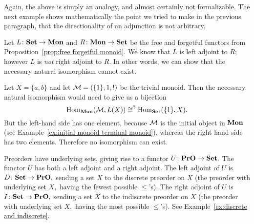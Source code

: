 \documentclass[../main/CT4S-EN-RU]{subfiles}
\begin{document}
\begin{blockRUS}
\end{blockRUS}

\begin{blockENG}
Again, the above is simply an analogy, and almost certainly not formalizable. The next example shows mathematically the point we tried to make in the previous paragraph, that the directionality of an adjunction is not arbitrary.
\end{blockENG}

\begin{blockRUS}
\end{blockRUS}

\begin{exampleENG}\label{ex:adjunction monoids and sets}
Let $L\colon{\mathbf{Set}}\rightarrow{\mathbf{Mon}}$ and $R\colon{\mathbf{Mon}}\rightarrow{\mathbf{Set}}$ be the free and forgetful functors from Proposition~\ref{prop:free forgetful monoid}. We know that $L$ is left adjoint to $R$; however $L$ is {\em not} right adjoint to $R.$ In other words, we can show that the necessary natural isomorphism cannot exist.

Let $X=\{a,b\}$ and let $\mathcal{M}=(\{1\},1,!)$ be the trivial monoid. Then the necessary natural isomorphism would need to give us a bijection 
$$\operatorname{Hom}_{\mathbf{Mon}}(\mathcal{M},L(X))\cong^?\operatorname{Hom}_{\mathbf{Set}}(\{1\},X).$$ 
But the left-hand side has one element, because $\mathcal{M}$ is the initial object in ${\mathbf{Mon}}$ (see Example~\ref{ex:initial monoid terminal monoid}), whereas the right-hand side has two elements. Therefore no isomorphism can exist.
\end{exampleENG}

\begin{exampleRUS}\label{ex:adjunction monoids and sets}
\end{exampleRUS}

\begin{exampleENG}
Preorders have underlying sets, giving rise to a functor $U\colon{\mathbf{PrO}}\rightarrow{\mathbf{Set}}.$ The functor $U$ has both a left adjoint and a right adjoint. The left adjoint of $U$ is $D\colon{\mathbf{Set}}\rightarrow{\mathbf{PrO}},$ sending a set $X$ to the discrete preorder on $X$ (the preorder with underlying set $X,$ having the fewest possible $\leq$'s). The right adjoint of $U$ is $I\colon{\mathbf{Set}}\rightarrow{\mathbf{PrO}},$ sending a set $X$ to the indiscrete preorder on $X$ (the preorder with underlying set $X,$ having the most possible $\leq$'s). See Example~\ref{ex:discrete and indiscrete}. 
\end{exampleENG}
\end{document}
